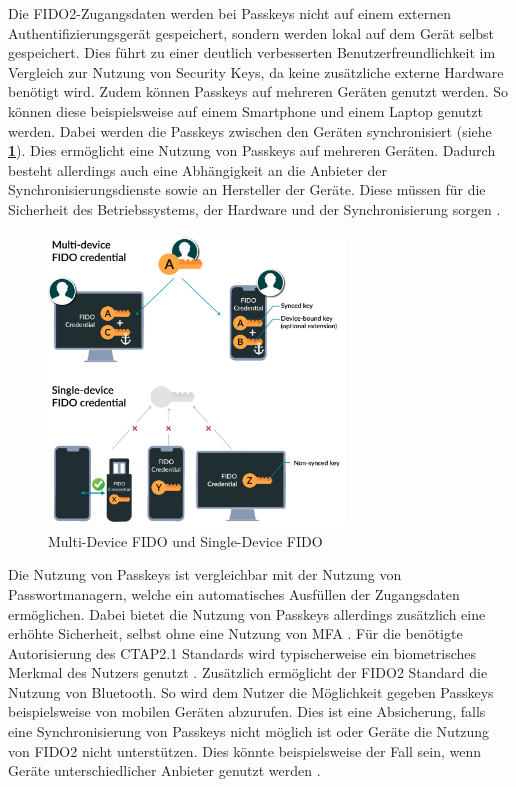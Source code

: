 Die \ac{FIDO}2-Zugangsdaten werden bei Passkeys nicht auf einem externen Authentifizierungsgerät gespeichert, sondern werden lokal auf dem Gerät selbst gespeichert. Dies führt zu einer deutlich verbesserten Benutzerfreundlichkeit im Vergleich zur Nutzung von Security Keys, da keine zusätzliche externe Hardware benötigt wird. Zudem können Passkeys auf mehreren Geräten genutzt werden. So können diese beispielsweise auf einem Smartphone und einem Laptop genutzt werden. Dabei werden die Passkeys zwischen den Geräten synchronisiert (siehe \textbf{\ref{passkeys-img}}). Dies ermöglicht eine Nutzung von Passkeys auf mehreren Geräten. Dadurch besteht allerdings auch eine Abhängigkeit an die Anbieter der Synchronisierungsdienste sowie an Hersteller der Geräte. Diese müssen für die Sicherheit des Betriebssystems, der Hardware und der Synchronisierung sorgen \cite{usecasfido}. 

\begin{figure}[h]
	\centering 
	\includegraphics[width=0.7\textwidth]{img/abbildungen/multi-device-fido2.png}
	\captionsetup{format=hang}
	\caption{Multi-Device \ac{FIDO} und Single-Device \ac{FIDO} \cite{usecasfido}} \label{passkeys-img}
\end{figure}

Die Nutzung von Passkeys ist vergleichbar mit der Nutzung von Passwortmanagern, welche ein automatisches Ausfüllen der Zugangsdaten ermöglichen. Dabei bietet die Nutzung von Passkeys allerdings zusätzlich eine erhöhte Sicherheit, selbst ohne eine Nutzung von \ac{MFA} \cite{usecasfido} \cite{passkeysgoogle}. Für die benötigte Autorisierung des CTAP2.1 Standards wird typischerweise ein biometrisches Merkmal des Nutzers genutzt \cite{usecasfido}. Zusätzlich ermöglicht der \ac{FIDO}2 Standard die Nutzung von Bluetooth. So wird dem Nutzer die Möglichkeit gegeben Passkeys beispielsweise von mobilen Geräten abzurufen. Dies ist eine Absicherung, falls eine Synchronisierung von Passkeys nicht möglich ist oder Geräte die Nutzung von \ac{FIDO}2 nicht unterstützen. Dies könnte beispielsweise der Fall sein, wenn Geräte unterschiedlicher Anbieter genutzt werden \cite{usecasfido}.

